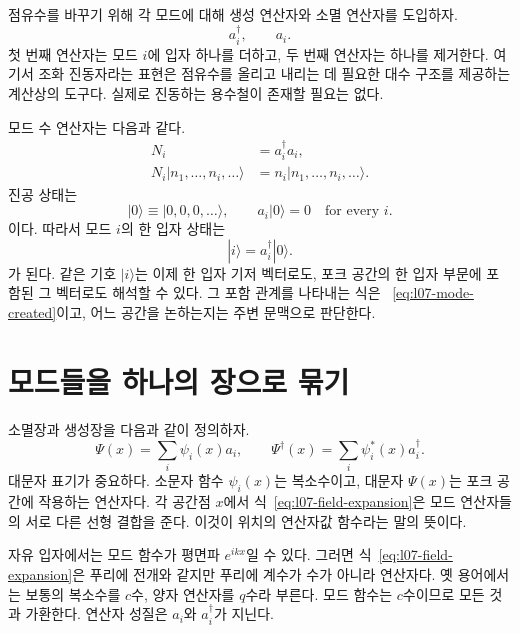 점유수를 바꾸기 위해 각 모드에 대해 생성 연산자와 소멸 연산자를 도입하자.
\begin{equation}
a_i^\dagger,\qquad a_i.
\end{equation}
첫 번째 연산자는 모드 \(i\)에 입자 하나를 더하고, 두 번째 연산자는 하나를 제거한다. 여기서 조화 진동자라는 표현은 점유수를 올리고 내리는 데 필요한 대수 구조를 제공하는 계산상의 도구다. 실제로 진동하는 용수철이 존재할 필요는 없다.

모드 수 연산자는 다음과 같다.
\begin{equation}
\begin{aligned}
N_i&=a_i^\dagger a_i,\\
N_i|n_1,\ldots,n_i,\ldots\rangle
&=n_i|n_1,\ldots,n_i,\ldots\rangle.
\end{aligned}
\end{equation}
진공 상태는
\begin{equation}
|0\rangle\equiv|0,0,0,\ldots\rangle,
\qquad
a_i|0\rangle=0
\quad\text{for every }i.
\label{eq:l07-vacuum}
\end{equation}
이다. 따라서 모드 \(i\)의 한 입자 상태는
\begin{equation}
|i\rangle=a_i^\dagger|0\rangle.
\label{eq:l07-mode-created}
\end{equation}
가 된다. 같은 기호 \(|i\rangle\)는 이제 한 입자 기저 벡터로도, 포크 공간의 한 입자 부문에 포함된 그 벡터로도 해석할 수 있다. 그 포함 관계를 나타내는 식은 ~\eqref{eq:l07-mode-created}이고, 어느 공간을 논하는지는 주변 문맥으로 판단한다.

\section{모드들을 하나의 장으로 묶기}

소멸장과 생성장을 다음과 같이 정의하자.
\begin{equation}
\Psi(x)=\sum_i \psi_i(x)a_i,
\qquad
\Psi^\dagger(x)=\sum_i \psi_i^*(x)a_i^\dagger.
\label{eq:l07-field-expansion}
\end{equation}
대문자 표기가 중요하다. 소문자 함수 \(\psi_i(x)\)는 복소수이고, 대문자 \(\Psi(x)\)는 포크 공간에 작용하는 연산자다. 각 공간점 \(x\)에서 식~\eqref{eq:l07-field-expansion}은 모드 연산자들의 서로 다른 선형 결합을 준다. 이것이 위치의 연산자값 함수라는 말의 뜻이다.

자유 입자에서는 모드 함수가 평면파 \(e^{ikx}\)일 수 있다. 그러면 식~\eqref{eq:l07-field-expansion}은 푸리에 전개와 같지만 푸리에 계수가 수가 아니라 연산자다. 옛 용어에서는 보통의 복소수를 \(c\)수, 양자 연산자를 \(q\)수라 부른다. 모드 함수는 \(c\)수이므로 모든 것과 가환한다. 연산자 성질은 \(a_i\)와 \(a_i^\dagger\)가 지닌다.

